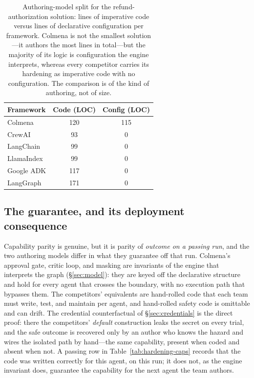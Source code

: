 \begin{table}[t]
  \centering
  \caption{Authoring-model split for the refund-authorization solution:
    lines of imperative code versus lines of declarative configuration per
    framework. Colmena is not the smallest solution---it authors the most
    lines in total---but the majority of its logic is configuration the
    engine interprets, whereas every competitor carries its hardening as
    imperative code with no configuration. The comparison is of the kind of
    authoring, not of size.}
  \label{tab:hardening-loc}
  \begin{tabular}{lS[table-format=3.0]S[table-format=3.0]}
    \toprule
    Framework & {Code (LOC)} & {Config (LOC)} \\
    \midrule
    Colmena     & 120 & 115 \\
    \midrule
    CrewAI      &  93 &   0 \\
    LangChain   &  99 &   0 \\
    LlamaIndex  &  99 &   0 \\
    Google ADK  & 117 &   0 \\
    LangGraph   & 171 &   0 \\
    \bottomrule
  \end{tabular}
\end{table}

\subsection{The guarantee, and its deployment consequence}
\label{subsec:hardening-guarantee}

Capability parity is genuine, but it is parity of \emph{outcome on a passing
run}, and the two authoring models differ in what they guarantee off that
run. Colmena's approval gate, critic loop, and masking are invariants of the
engine that interprets the graph (\S\ref{sec:model}): they are keyed off the
declarative structure and hold for every agent that crosses the boundary,
with no execution path that bypasses them. The competitors' equivalents are
hand-rolled code that each team must write, test, and maintain per agent, and
hand-rolled safety code is omittable and can drift. The credential
counterfactual of \S\ref{sec:credentials} is the direct proof: there the
competitors' \emph{default} construction leaks the secret on every trial, and
the safe outcome is recovered only by an author who knows the hazard and wires
the isolated path by hand---the same capability, present when coded and absent
when not. A passing row in Table~\ref{tab:hardening-caps} records that the
code was written correctly for this agent, on this run; it does not, as the
engine invariant does, guarantee the capability for the next agent the team
authors.

